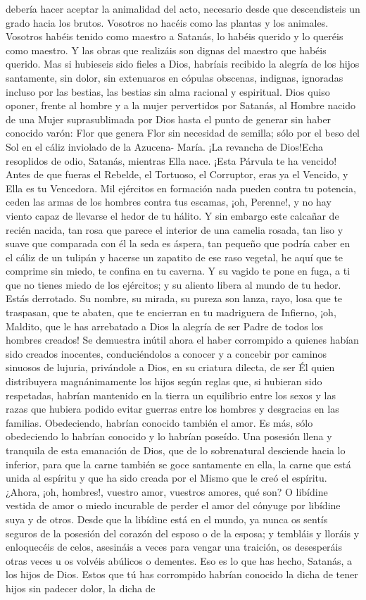 \documentclass[12pt]{book} %
\begin{document}
debería hacer aceptar la animalidad del acto, necesario desde que descendisteis un grado hacia los brutos. Vosotros no hacéis como las plantas y los animales. Vosotros habéis tenido como maestro a Satanás, lo habéis querido y lo queréis como maestro. Y las obras que realizáis son dignas del maestro que habéis querido. Mas si hubieseis sido fieles a Dios, habríais recibido la alegría de los hijos santamente, sin dolor, sin extenuaros en cópulas obscenas, indignas, ignoradas incluso por las bestias, las bestias sin alma racional y espiritual. Dios quiso oponer, frente al hombre y a la mujer pervertidos por Satanás, al Hombre nacido de una Mujer suprasublimada por Dios hasta el punto de generar sin haber conocido varón: Flor que genera Flor sin necesidad de semilla; sólo por el beso del Sol en el cáliz inviolado de la Azucena- María. ¡La revancha de Dios!Echa resoplidos de odio, Satanás, mientras Ella nace. ¡Esta Párvula te ha vencido! Antes de que fueras el Rebelde, el Tortuoso, el Corruptor, eras ya el Vencido, y Ella es tu Vencedora. Mil ejércitos en formación nada pueden contra tu potencia, ceden las armas de los hombres contra tus escamas, ¡oh, Perenne!, y no hay viento capaz de llevarse el hedor de tu hálito. Y sin embargo este calcañar de recién nacida, tan rosa que parece el interior de una camelia rosada, tan liso y suave que comparada con él la seda es áspera, tan pequeño que podría caber en el cáliz de un tulipán y hacerse un zapatito de ese raso vegetal, he aquí que te comprime sin miedo, te confina en tu caverna. Y su vagido te pone en fuga, a ti que no tienes miedo de los ejércitos; y su aliento libera al mundo de tu hedor. Estás derrotado. Su nombre, su mirada, su pureza son lanza, rayo, losa que te traspasan, que te abaten, que te encierran en tu madriguera de Infierno, ¡oh, Maldito, que le has arrebatado a Dios la alegría de ser Padre de todos los hombres creados! Se demuestra inútil ahora el haber corrompido a quienes habían sido creados inocentes, conduciéndolos a conocer y a concebir por caminos sinuosos de lujuria, privándole a Dios, en su criatura dilecta, de ser Él quien distribuyera magnánimamente los hijos según reglas que, si hubieran sido respetadas, habrían mantenido en la tierra un equilibrio entre los sexos y las razas que hubiera podido evitar guerras entre los hombres y desgracias en las familias. Obedeciendo, habrían conocido también el amor. Es más, sólo obedeciendo lo habrían conocido y lo habrían poseído. Una posesión llena y tranquila de esta emanación de Dios, que de lo sobrenatural desciende hacia lo inferior, para que la carne también se goce santamente en ella, la carne que está unida al espíritu y que ha sido creada por el Mismo que le creó el espíritu. ¿Ahora, ¡oh, hombres!, vuestro amor, vuestros amores, qué son? O libídine vestida de amor o miedo incurable de perder el amor del cónyuge por libídine suya y de otros. Desde que la libídine está en el mundo, ya nunca os sentís seguros de la posesión del corazón del esposo o de la esposa; y tembláis y lloráis y enloquecéis de celos, asesináis a veces para vengar una traición, os desesperáis otras veces u os volvéis abúlicos o dementes. Eso es lo que has hecho, Satanás, a los hijos de Dios. Estos que tú has corrompido habrían conocido la dicha de tener hijos sin padecer dolor, la dicha de 
\end{document}
